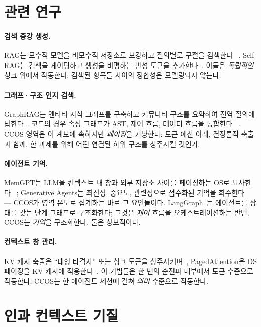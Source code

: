 \documentclass[11pt]{article}
\begin{document}
\section{관련 연구}\label{sec:related}

\paragraph{검색 증강 생성.} RAG는 모수적 모델을 비모수적 저장소로 보강하고 질의별로 구절을 검색한다
~\cite{lewis2020rag}. Self-RAG는 검색을 게이팅하고 생성을 비평하는 반성 토큰을 추가한다~\cite{asai2023selfrag}.
이들은 \emph{독립적인} 청크 위에서 작동한다; 검색된 항목들 사이의 정합성은 모델링되지 않는다.

\paragraph{그래프·구조 인지 검색.} GraphRAG는 엔티티 지식 그래프를 구축하고 커뮤니티 구조를 요약하여 전역 질의에
답한다~\cite{edge2024graphrag}. 코드의 경우 속성 그래프가 AST, 제어 흐름, 데이터 흐름을 통합한다
~\cite{yamaguchi2014cpg}. CCOS 영역은 이 계보에 속하지만 \emph{페이징}을 겨냥한다: 토큰 예산 아래, 결정론적
축출과 함께, 한 과제를 위해 어떤 연결된 하위 구조를 상주시킬 것인가.

\paragraph{에이전트 기억.} MemGPT는 LLM을 컨텍스트 내 창과 외부 저장소 사이를 페이징하는 OS로 묘사한다
~\cite{packer2023memgpt}; Generative Agents는 최신성, 중요도, 관련성으로 점수화된 기억을 회수한다
~\cite{park2023generative} --- CCOS가 영역 온도로 집계하는 바로 그 요인들이다. LangGraph~\cite{langgraph}는
에이전트를 상태를 갖는 단계 그래프로 구조화한다; 그것은 \emph{제어} 흐름을 오케스트레이션하는 반면, CCOS는
\emph{기억}을 구조화한다. 둘은 상보적이다.

\paragraph{컨텍스트 창 관리.} KV 캐시 축출은 ``대형 타격자'' 또는 싱크 토큰을 상주시키며~\cite{liu2023lost},
PagedAttention은 OS 페이징을 KV 캐시에 적용한다~\cite{kwon2023paged}. 이 기법들은 한 번의 순전파 내부에서
토큰 수준으로 작동한다; CCOS는 한 에이전트 세션에 걸쳐 \emph{의미} 수준으로 작동한다.

\section{인과 컨텍스트 기질}\label{sec:substrate}
\end{document}
